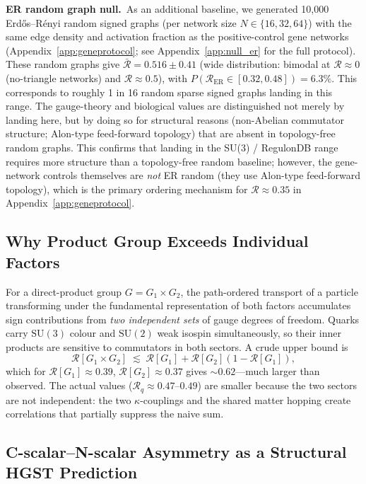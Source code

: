 \documentclass[12pt,a4paper]{article}
\newcommand{\R}{\mathcal{R}}           %
\newcommand{\SU}[1]{\mathrm{SU}(#1)}
\theoremstyle{plain}
\theoremstyle{definition}
\theoremstyle{remark}
\begin{document}
\medskip
\noindent\textbf{ER random graph null.}~As an additional baseline, we generated
10{,}000 Erd{\H o}s--R{\'e}nyi random signed graphs (per network size
$N\in\{16,32,64\}$) with the same edge density and activation fraction as the
positive-control gene networks (Appendix~\ref{app:geneprotocol}; see
Appendix~\ref{app:null_er} for the full protocol).
These random graphs give $\bar{\R}=0.516\pm0.41$ (wide distribution: bimodal at
$\R\approx0$ (no-triangle networks) and $\R\approx0.5$), with
$P(\R_\text{ER}\in[0.32,0.48])=6.3\%$.
This corresponds to roughly 1 in 16 random sparse signed graphs landing in this range.
The gauge-theory and biological values are distinguished not merely by landing
here, but by doing so for structural reasons (non-Abelian commutator structure;
Alon-type feed-forward topology) that are absent in topology-free random graphs.
This confirms that landing in the SU(3) / RegulonDB range requires more structure than
a topology-free random baseline; however, the gene-network controls themselves are
\emph{not} ER random (they use Alon-type feed-forward topology), which is the primary
ordering mechanism for $\R\approx0.35$ in Appendix~\ref{app:geneprotocol}.

\subsection{Why Product Group Exceeds Individual Factors}

For a direct-product group $G=G_1\times G_2$, the path-ordered transport of a
particle transforming under the fundamental representation of both factors
accumulates sign contributions from \emph{two independent sets} of gauge degrees
of freedom.
Quarks carry $\SU{3}$ colour and $\SU{2}$ weak isospin simultaneously, so their
inner products are sensitive to commutators in both sectors.
A crude upper bound is
\[
  \R[G_1\times G_2] \;\lesssim\; \R[G_1] + \R[G_2](1-\R[G_1]),
\]
which for $\R[G_1]\approx 0.39$, $\R[G_2]\approx 0.37$ gives $\sim 0.62$---much larger
than observed.
The actual values ($\R_q\approx0.47$--$0.49$) are smaller because the two sectors are
not independent: the two $\kappa$-couplings and the shared matter hopping create
correlations that partially suppress the naive sum.

\subsection{C-scalar--N-scalar Asymmetry as a Structural HGST Prediction}
\end{document}
